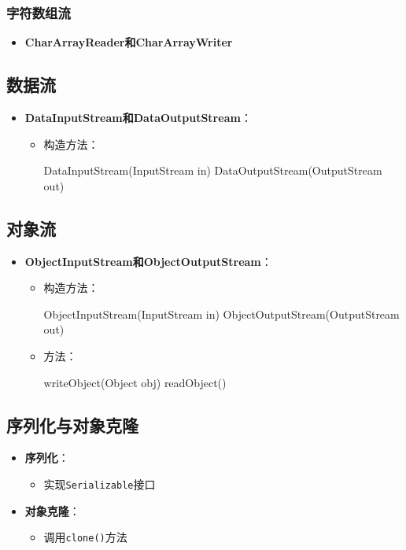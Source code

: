 \documentclass[a4paper, 10pt]{ctexart}
\begin{document}
\subsubsection{字符数组流}
\begin{itemize}
  \item \textbf{CharArrayReader和CharArrayWriter}
\end{itemize}

\subsection{数据流}
\begin{itemize}
  \item \textbf{DataInputStream和DataOutputStream}：
  \begin{itemize}
    \item 构造方法：
    \begin{codeblock}
DataInputStream(InputStream in)
DataOutputStream(OutputStream out)
    \end{codeblock}
  \end{itemize}
\end{itemize}

\subsection{对象流}
\begin{itemize}
  \item \textbf{ObjectInputStream和ObjectOutputStream}：
  \begin{itemize}
    \item 构造方法：
    \begin{codeblock}
ObjectInputStream(InputStream in)
ObjectOutputStream(OutputStream out)
    \end{codeblock}
    \item 方法：
    \begin{codeblock}
writeObject(Object obj)
readObject()
    \end{codeblock}
  \end{itemize}
\end{itemize}

\subsection{序列化与对象克隆}
\begin{itemize}
  \item \textbf{序列化}：
  \begin{itemize}
    \item 实现\texttt{Serializable}接口
  \end{itemize}
  \item \textbf{对象克隆}：
  \begin{itemize}
    \item 调用\texttt{clone()}方法
  \end{itemize}
\end{itemize}
\end{document}
